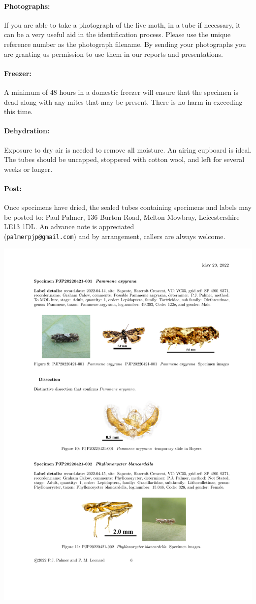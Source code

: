 \documentclass[12pt]{article}
\begin{document}
	\paragraph{Photographs:} If you are able to take a photograph of the live moth, in a tube if necessary, it can be a very useful aid in the identification process. Please use the unique reference number as the photograph filename. By sending your photographs you are granting us permission to use them in our reports and presentations.
	

	
	\paragraph{Freezer:} A minimum of 48 hours in a domestic freezer will ensure that the specimen is dead along with any mites that may be present. There is no harm in exceeding this time.
	\paragraph{Dehydration:} Exposure to dry air is needed to remove all moisture. An airing cupboard is ideal. The tubes should be uncapped, stoppered with cotton wool, and left for several weeks or longer. 
	\paragraph{Post:} Once specimens have dried, the sealed tubes containing specimens and labels may be posted to: Paul Palmer, 136 Burton Road, Melton Mowbray, Leicestershire LE13 1DL. An advance note is appreciated \\ (\texttt{palmerpjp@gmail.com}) and by arrangement, callers are always welcome.

	\begin{center}
	\centering
	\includegraphics[width=0.6\linewidth]{images/samplepage}\hfill
	
	\label{GenDet}
\end{center}
\end{document}
